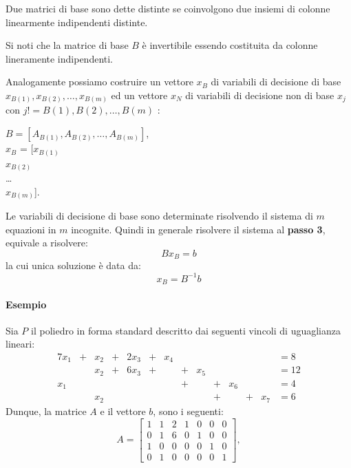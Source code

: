 Due matrici di base sono dette distinte se coinvolgono due insiemi di colonne linearmente indipendenti distinte.

Si noti che la matrice di base $B$ è invertibile essendo costituita da colonne lineramente indipendenti.

Analogamente possiamo costruire un vettore $x_B$ di variabili di decisione di base $x_{B(1)},x_{B(2)},\dots,x_{B(m)}$ ed un vettore $x_N$ di variabili di decisione non di base $x_j$
con $j != B(1),B(2),\dots,B(m)$ :
\begin{center}
$B = [A_{B(1)},A_{B(2)},\dots,A_{B(m)}]$, \\
$x_B$ = [$x_{B(1)}$ \\ $x_{B(2)}$ \\ \dots \\ $x_{B(m)}$].
\end{center}

Le variabili di decisione di base sono determinate risolvendo il sistema di $m$ equazioni in $m$ incognite.
Quindi in generale risolvere il sistema al \textbf{passo 3}, equivale a risolvere:
\begin{equation}
    B x_B = b
\end{equation}
la cui unica soluzione è data da:
\begin{equation}
    x_B = B^{-1} b
\end{equation}

\paragraph{Esempio}Sia $P$ il poliedro in forma standard descritto dai seguenti vincoli di uguaglianza lineari:
\begin{alignat*}{7}
x_1 & + {} & x_2 & + {} & 2x_3 & + {} & x_4 &      &     &      &     &      &     & = 8 \\
    &      & x_2 & + {} & 6x_3 & + {} &     & {} + & x_5 &      &     &      &     & = 12 \\
x_1 &      &     &      &      &      &     & {} + &     & {} + & x_6 &      &     & = 4 \\
    &      & x_2 &      &      &      &     &      &     & {} + &     & {} + & x_7 & = 6
\end{alignat*}
Dunque, la matrice $A$ e il vettore $b$, sono i seguenti:
\[
A = \begin{bmatrix}
1 & 1 & 2 & 1 & 0 & 0 & 0 \\
0 & 1 & 6 & 0 & 1 & 0 & 0 \\
1 & 0 & 0 & 0 & 0 & 1 & 0 \\
0 & 1 & 0 & 0 & 0 & 0 & 1
\end{bmatrix},
\]

